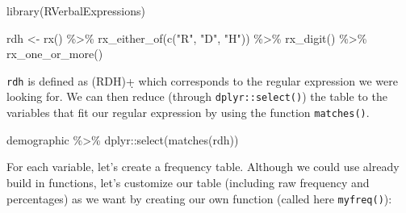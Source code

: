 \documentclass[
]{krantz}
\makeatletter
\newenvironment{Shaded}{\begin{snugshade}}{\end{snugshade}}
\newcommand{\FunctionTok}[1]{\textcolor[rgb]{0,0,0}{#1}}
\newcommand{\NormalTok}[1]{#1}
\newcommand{\OtherTok}[1]{\textcolor[rgb]{0.37,0.37,0.37}{#1}}
\newcommand{\SpecialCharTok}[1]{\textcolor[rgb]{0,0,0}{#1}}
\newcommand{\StringTok}[1]{\textcolor[rgb]{0.5,0.5,0.5}{#1}}
\newenvironment{kframe}{%
\medskip{}
\setlength{\fboxsep}{.8em}
 \def\at@end@of@kframe{}%
 \ifinner\ifhmode%
  \def\at@end@of@kframe{\end{minipage}}%
  \begin{minipage}{\columnwidth}%
 \fi\fi%
 \def\FrameCommand##1{\hskip\@totalleftmargin \hskip-\fboxsep
 \colorbox{shadecolor}{##1}\hskip-\fboxsep
     \hskip-\linewidth \hskip-\@totalleftmargin \hskip\columnwidth}%
 \MakeFramed {\advance\hsize-\width
   \@totalleftmargin\z@ \linewidth\hsize
   \@setminipage}}%
 {\par\unskip\endMakeFramed%
 \at@end@of@kframe}
\renewenvironment{Shaded}{\begin{kframe}}{\end{kframe}}
\makeatother
\begin{document}
\begin{Shaded}
\begin{Highlighting}[]
\FunctionTok{library}\NormalTok{(RVerbalExpressions)}

\NormalTok{rdh }\OtherTok{\textless{}{-}} \FunctionTok{rx}\NormalTok{() }\SpecialCharTok{\%\textgreater{}\%}
  \FunctionTok{rx\_either\_of}\NormalTok{(}\FunctionTok{c}\NormalTok{(}\StringTok{"R"}\NormalTok{, }\StringTok{"D"}\NormalTok{, }\StringTok{"H"}\NormalTok{)) }\SpecialCharTok{\%\textgreater{}\%}
  \FunctionTok{rx\_digit}\NormalTok{() }\SpecialCharTok{\%\textgreater{}\%}
  \FunctionTok{rx\_one\_or\_more}\NormalTok{()}
\end{Highlighting}
\end{Shaded}

\texttt{rdh} is defined as (R\textbar D\textbar H)\d+ which corresponds to the regular expression we were looking for. We can then reduce (through \texttt{dplyr::select()}) the table to the variables that fit our regular expression by using the function \texttt{matches()}.

\begin{Shaded}
\begin{Highlighting}[]
\NormalTok{demographic }\SpecialCharTok{\%\textgreater{}\%}
\NormalTok{  dplyr}\SpecialCharTok{::}\FunctionTok{select}\NormalTok{(}\FunctionTok{matches}\NormalTok{(rdh))}
\end{Highlighting}
\end{Shaded}

For each variable, let's create a frequency table. Although we could use already build in functions, let's customize our table (including raw frequency and percentages) as we want by creating our own function (called here \texttt{myfreq()}):
\end{document}
